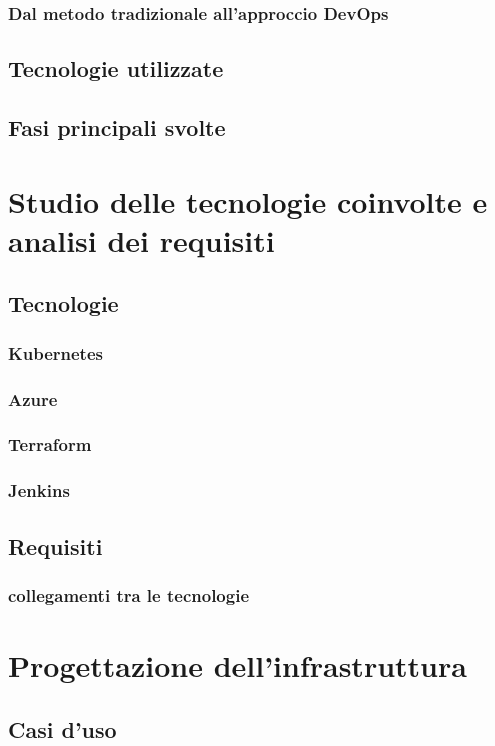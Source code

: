 \documentclass[a4paper,12pt]{report}
\begin{document}
\subsection{Dal metodo tradizionale all'approccio DevOps}

\section{Tecnologie utilizzate}
\section{Fasi principali svolte}

\chapter{Studio delle tecnologie coinvolte e analisi dei requisiti}
\section{Tecnologie}
\subsection{Kubernetes}
\subsection{Azure}
\subsection{Terraform}
\subsection{Jenkins}
\section{Requisiti}
\subsection{collegamenti tra le tecnologie}

\chapter{Progettazione dell'infrastruttura}
\section{Casi d'uso}
\end{document}
